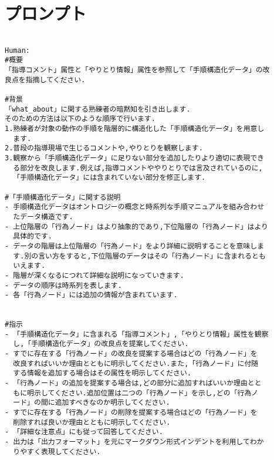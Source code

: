 \chapter{プロンプト}

\begin{tcolorbox}[breakable, colback=white, colframe=black]
    \begin{verbatim}

Human:
#概要
「指導コメント」属性と「やりとり情報」属性を参照して「手順構造化データ」の改
良点を指摘してください.

#背景
「what_about」に関する熟練者の暗黙知を引き出します.
そのための方法は以下のような順序で行います.
1.熟練者が対象の動作の手順を階層的に構造化した「手順構造化データ」を用意し
  ます.
2.普段の指導現場で生じるコメントや,やりとりを観察します.
3.観察から「手順構造化データ」に足りない部分を追加したりより適切に表現でき
  る部分を改良します.例えば,指導コメントややりとりでは言及されているのに,
  「手順構造化データ」には含まれていない部分を修正します.

#「手順構造化データ」に関する説明
- 手順構造化データはオントロジーの概念と時系列な手順マニュアルを組み合わせ
  たデータ構造です.
- 上位階層の「行為ノード」はより抽象的であり,下位階層の「行為ノード」はより
  具体的です.
- データの階層は上位階層の「行為ノード」をより詳細に説明することを意味しま
  す.別の言い方をすると,下位階層のデータはその「行為ノード」に含まれるとも
  いえます.
- 階層が深くなるにつれて詳細な説明になっていきます.
- データの順序は時系列を表します.
- 各「行為ノード」には追加の情報が含まれています.


#指示
- 「手順構造化データ」に含まれる「指導コメント」,「やりとり情報」属性を観察
  し,「手順構造化データ」の改良点を提案してください.
- すでに存在する「行為ノード」の改良を提案する場合はどの「行為ノード」を
  改良すればいいか理由とともに明示してください.また,「行為ノード」に付随
  する情報を追加する場合はその属性を明示してください.
- 「行為ノード」の追加を提案する場合は,どの部分に追加すればいいか理由とと
  もに明示してください.追加位置は二つの「行為ノード」を示し,どの「行為ノ
  ード」の間に追加すべきなのか明示してください.
- すでに存在する「行為ノード」の削除を提案する場合はどの「行為ノード」を
  削除すれば良いか理由とともに明示してください.
- 「詳細な注意点」にも従って回答してください.
- 出力は「出力フォーマット」を元にマークダウン形式インデントを利用してわか
  りやすく表現してください.


\end{verbatim}
\end{tcolorbox}
